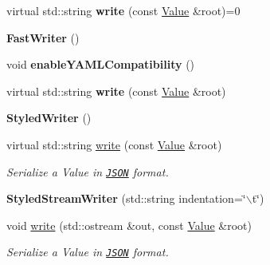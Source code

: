 \begin{DoxyCompactItemize}
\item 
\hypertarget{protocol_json_1_1_j_s_o_n___a_p_i_aeb007c2dc036bd1accab064f36e591c9}{virtual std\-::string {\bfseries write} (const \hyperlink{protocol_json_1_1_j_s_o_n___a_p_i_a3a85c4423131080eb9300546d6130dfd}{Value} \&root)=0}\label{protocol_json_1_1_j_s_o_n___a_p_i_aeb007c2dc036bd1accab064f36e591c9}

\item 
\hypertarget{protocol_json_1_1_j_s_o_n___a_p_i_a4cd498bc45daeff40b5a9d07bf880822}{{\bfseries Fast\-Writer} ()}\label{protocol_json_1_1_j_s_o_n___a_p_i_a4cd498bc45daeff40b5a9d07bf880822}

\item 
\hypertarget{protocol_json_1_1_j_s_o_n___a_p_i_a4a9b42293fcfb7bb8415f4b23f44f353}{void {\bfseries enable\-Y\-A\-M\-L\-Compatibility} ()}\label{protocol_json_1_1_j_s_o_n___a_p_i_a4a9b42293fcfb7bb8415f4b23f44f353}

\item 
\hypertarget{protocol_json_1_1_j_s_o_n___a_p_i_acfac8c5774ac05e3fd04f4a8b8a59785}{virtual std\-::string {\bfseries write} (const \hyperlink{protocol_json_1_1_j_s_o_n___a_p_i_a3a85c4423131080eb9300546d6130dfd}{Value} \&root)}\label{protocol_json_1_1_j_s_o_n___a_p_i_acfac8c5774ac05e3fd04f4a8b8a59785}

\item 
\hypertarget{protocol_json_1_1_j_s_o_n___a_p_i_a5c86edefaffa6a79ef2e2dba5a1c359c}{{\bfseries Styled\-Writer} ()}\label{protocol_json_1_1_j_s_o_n___a_p_i_a5c86edefaffa6a79ef2e2dba5a1c359c}

\item 
virtual std\-::string \hyperlink{protocol_json_1_1_j_s_o_n___a_p_i_acfac8c5774ac05e3fd04f4a8b8a59785}{write} (const \hyperlink{protocol_json_1_1_j_s_o_n___a_p_i_a3a85c4423131080eb9300546d6130dfd}{Value} \&root)
\begin{DoxyCompactList}\small\item\em Serialize a Value in \href{http://www.json.org}{\tt J\-S\-O\-N} format. \end{DoxyCompactList}\item 
\hypertarget{protocol_json_1_1_j_s_o_n___a_p_i_aad71cf3227df61afb2b7402ab03eba2e}{{\bfseries Styled\-Stream\-Writer} (std\-::string indentation=\char`\"{}$\backslash$t\char`\"{})}\label{protocol_json_1_1_j_s_o_n___a_p_i_aad71cf3227df61afb2b7402ab03eba2e}

\item 
void \hyperlink{protocol_json_1_1_j_s_o_n___a_p_i_ae61ccd20341537c6f7b7212097db574d}{write} (std\-::ostream \&out, const \hyperlink{protocol_json_1_1_j_s_o_n___a_p_i_a3a85c4423131080eb9300546d6130dfd}{Value} \&root)
\begin{DoxyCompactList}\small\item\em Serialize a Value in \href{http://www.json.org}{\tt J\-S\-O\-N} format. \end{DoxyCompactList}\end{DoxyCompactItemize}
